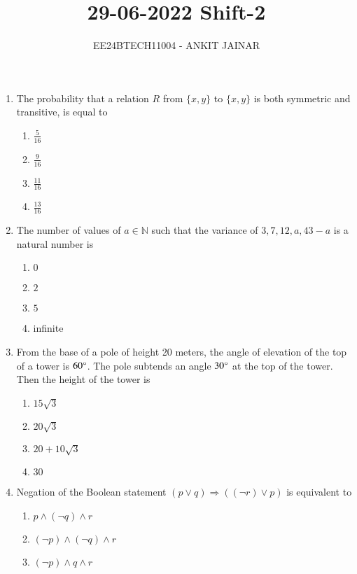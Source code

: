 \documentclass[journal,12pt,onecolumn]{IEEEtran}
\theoremstyle{remark}
\begin{document}

\vspace{3cm}

\title{\textbf{29-06-2022 Shift-2}}
\author{EE24BTECH11004 - ANKIT JAINAR}
\maketitle
\bigskip

\renewcommand{\thefigure}{\theenumi}
\renewcommand{\thetable}{\theenumi}
\setlength{\columnsep}{2.5em}
\begin{enumerate}
\item The probability that a relation $R$ from $\{x, y\}$ to $\{x, y\}$ is both symmetric and transitive, is equal to
\begin{enumerate}
    \item $\frac{5}{16}$
    \item $\frac{9}{16}$
    \item $\frac{11}{16}$
    \item $\frac{13}{16}$
\end{enumerate}
\item The number of values of $a \in \mathbb{N}$ such that the variance of $3, 7, 12, a, 43 - a$ is a natural number is
\begin{enumerate}
    \item $0$
    \item $2$
    \item $5$
    \item infinite
\end{enumerate}
\item From the base of a pole of height 20 meters, the angle of elevation of the top of a tower is $60\degree$. The pole subtends an angle $30\degree$ at the top of the tower. Then the height of the tower is
\begin{enumerate}
    \item $15\sqrt{3}$
    \item $20\sqrt{3}$
    \item $20 + 10\sqrt{3}$
    \item $30$
\end{enumerate}
\item Negation of the Boolean statement $(p \lor q) \Rightarrow ((\neg r) \lor p)$ is equivalent to
\begin{enumerate}
    \item $p \land (\neg q) \land r$
    \item $(\neg p) \land (\neg q) \land r$
    \item $(\neg p) \land q \land r$

\end{enumerate}
\end{enumerate}
\end{document}
